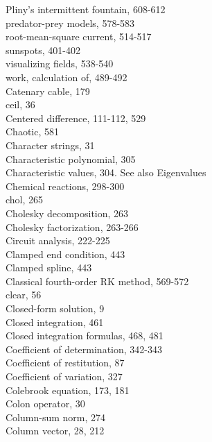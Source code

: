 \documentclass[../main.tex]{subfiles}
\begin{document}
\begin{multicols}{3}
    \hspace*{3mm}Pliny's intermittent fountain, 608-612\\
    \hspace*{3mm}predator-prey models, 578-583\\
    \hspace*{3mm}root-mean-square current, 514-517\\
    \hspace*{3mm}sunspots, 401-402\\
    \hspace*{3mm}visualizing fields, 538-540\\
    \hspace*{3mm}work, calculation of, 489-492\\
    Catenary cable, 179\\
    ceil, 36\\
    Centered difference, 111-112, 529\\
    Chaotic, 581\\
    Character strings, 31\\
    Characteristic polynomial, 305\\
    Characteristic values, 304. See also Eigenvalues\\
    Chemical reactions, 298-300\\
    chol, 265\\
    Cholesky decomposition, 263\\
    Cholesky factorization, 263-266\\
    Circuit analysis, 222-225\\
    Clamped end condition, 443\\
    Clamped spline, 443\\
    Classical fourth-order RK method, 569-572\\
    clear, 56\\
    Closed-form solution, 9\\
    Closed integration, 461\\
    Closed integration formulas, 468, 481\\
    Coefficient of determination, 342-343\\
    Coefficient of restitution, 87\\
    Coefficient of variation, 327\\
    Colebrook equation, 173, 181\\
    Colon operator, 30\\
    Column-sum norm, 274\\
    Column vector, 28, 212\\

\end{multicols}
\end{document}
